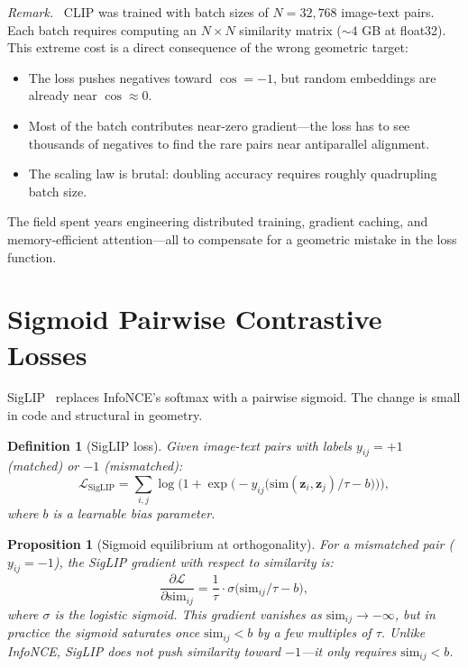 \documentclass[11pt,a4paper]{article}
\newtheorem{proposition}[theorem]{Proposition}
\newtheorem{definition}[theorem]{Definition}
\theoremstyle{remark}
\newenvironment{geometricinsight}{\par\medskip\noindent\textit{Remark.}\ }{\par\medskip}
\begin{document}
\begin{geometricinsight}
CLIP was trained with batch sizes of $N = 32{,}768$ image-text pairs.
Each batch requires computing an $N \times N$ similarity matrix ($\sim 4$ GB at float32).
This extreme cost is a direct consequence of the wrong geometric target:
\begin{itemize}
  \item The loss pushes negatives toward $\cos = -1$, but random embeddings are already near $\cos \approx 0$.
  \item Most of the batch contributes near-zero gradient---the loss has to see thousands of negatives to find the rare pairs near antiparallel alignment.
  \item The scaling law is brutal: doubling accuracy requires roughly quadrupling batch size.
\end{itemize}
The field spent years engineering distributed training, gradient caching, and memory-efficient attention---all to compensate for a geometric mistake in the loss function.
\end{geometricinsight}


\section{Sigmoid Pairwise Contrastive Losses}
\label{sec:siglip}

SigLIP~\cite{zhai2023siglip} replaces InfoNCE's softmax with a pairwise sigmoid.
The change is small in code and structural in geometry.

\begin{definition}[SigLIP loss]
\label{def:siglip}
Given image-text pairs with labels $y_{ij} = +1$ (matched) or $-1$ (mismatched):
\begin{equation}
  \mathcal{L}_\text{SigLIP} = \sum_{i,j} \log\bigl(1 + \exp\bigl(-y_{ij}\bigl(\mathrm{sim}(\mathbf{z}_i, \mathbf{z}_j)/\tau - b\bigr)\bigr)\bigr),
  \label{eq:siglip}
\end{equation}
where $b$ is a learnable bias parameter.
\end{definition}

\begin{proposition}[Sigmoid equilibrium at orthogonality]
\label{prop:siglip-equilibrium}
For a mismatched pair ($y_{ij} = -1$), the SigLIP gradient with respect to similarity is:
\begin{equation}
  \frac{\partial \mathcal{L}}{\partial \mathrm{sim}_{ij}} = \frac{1}{\tau} \cdot \sigma\bigl(\mathrm{sim}_{ij}/\tau - b\bigr),
  \label{eq:siglip-grad}
\end{equation}
where $\sigma$ is the logistic sigmoid.
This gradient vanishes as $\mathrm{sim}_{ij} \to -\infty$, but in practice the sigmoid saturates once $\mathrm{sim}_{ij} < b$ by a few multiples of $\tau$.
Unlike InfoNCE, SigLIP does \emph{not} push similarity toward $-1$---it only requires $\mathrm{sim}_{ij} < b$.
\end{proposition}
\end{document}
